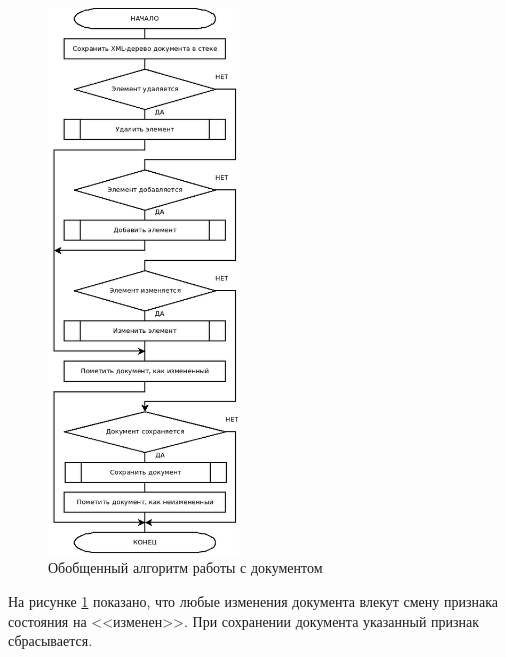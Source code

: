\begin{figure}[H]
  \centering
  \includegraphics[width=0.45\textwidth]{diagrams/block-schemes/change.png}
  \caption{Обобщенный алгоритм работы с документом}
  \label{fig:change}
\end{figure}

На рисунке \ref{fig:change} показано, что любые изменения документа влекут смену признака состояния на <<изменен>>.
При сохранении документа указанный признак сбрасывается.

